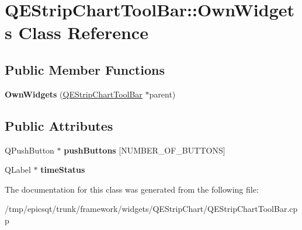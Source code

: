 \hypertarget{classQEStripChartToolBar_1_1OwnWidgets}{
\section{QEStripChartToolBar::OwnWidgets Class Reference}
\label{classQEStripChartToolBar_1_1OwnWidgets}
}
\subsection*{Public Member Functions}
\begin{DoxyCompactItemize}
\item 
\hypertarget{classQEStripChartToolBar_1_1OwnWidgets_aeee71859e97c5618ca82d9b94c1a9974}{
{\bfseries OwnWidgets} (\hyperlink{classQEStripChartToolBar}{QEStripChartToolBar} $\ast$parent)}
\label{classQEStripChartToolBar_1_1OwnWidgets_aeee71859e97c5618ca82d9b94c1a9974}

\end{DoxyCompactItemize}
\subsection*{Public Attributes}
\begin{DoxyCompactItemize}
\item 
\hypertarget{classQEStripChartToolBar_1_1OwnWidgets_a41b4f4bc025beaeb9146a44638ebc5c6}{
QPushButton $\ast$ {\bfseries pushButtons} \mbox{[}NUMBER\_\-OF\_\-BUTTONS\mbox{]}}
\label{classQEStripChartToolBar_1_1OwnWidgets_a41b4f4bc025beaeb9146a44638ebc5c6}

\item 
\hypertarget{classQEStripChartToolBar_1_1OwnWidgets_a6a3ce5d64435364f376c127adfdd72e5}{
QLabel $\ast$ {\bfseries timeStatus}}
\label{classQEStripChartToolBar_1_1OwnWidgets_a6a3ce5d64435364f376c127adfdd72e5}

\end{DoxyCompactItemize}


The documentation for this class was generated from the following file:\begin{DoxyCompactItemize}
\item 
/tmp/epicsqt/trunk/framework/widgets/QEStripChart/QEStripChartToolBar.cpp\end{DoxyCompactItemize}
